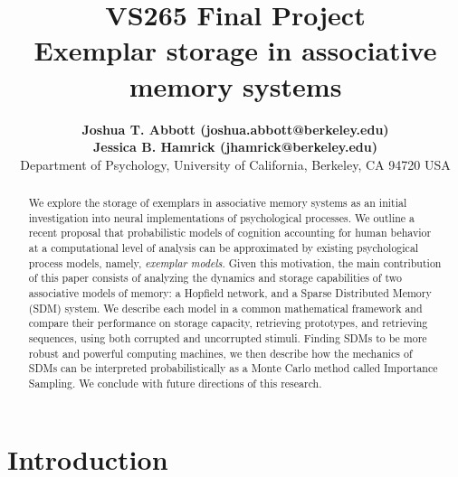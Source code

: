 \documentclass[10pt,letterpaper]{article}
\title{{\bf VS265 Final Project}\\Exemplar storage in associative memory systems}
\author{{\large \bf Joshua T. Abbott (joshua.abbott@berkeley.edu)\footnoteremember{myfootnote}{The authors contributed equally to this work.}} \\
 {\large \bf Jessica B. Hamrick (jhamrick@berkeley.edu)\footnoterecall{myfootnote}} \\
  Department of Psychology, University of California, Berkeley, CA 94720 USA}
\date{}
\begin{document}
\maketitle

\begin{abstract}
We explore the storage of exemplars in associative memory systems as an initial investigation into neural implementations of psychological processes. We outline a recent proposal that probabilistic models of cognition accounting for human behavior at a computational level of analysis can be approximated by existing psychological process models, namely, \textit{exemplar models}. Given this motivation, the main contribution of this paper consists of analyzing the dynamics and storage capabilities of two associative models of memory: a Hopfield network, and a Sparse Distributed Memory (SDM) system. We describe each model in a common mathematical framework and compare their performance  on storage capacity, retrieving prototypes, and retrieving sequences, using both corrupted and uncorrupted stimuli. Finding SDMs to be more robust and powerful computing machines, we then describe how the mechanics of SDMs can be interpreted probabilistically as a Monte Carlo method called Importance Sampling. We conclude with future directions of this research. 

\end{abstract}

\section{Introduction}

\cite{griffiths2010probabilistic,tenenbaum2011grow}

\cite{kahneman1972subjective,gigerenzer2000simple}

\cite{marr82,anderson90}

\cite{sanborn2010rational,griffiths2012bridging}
\end{document}
